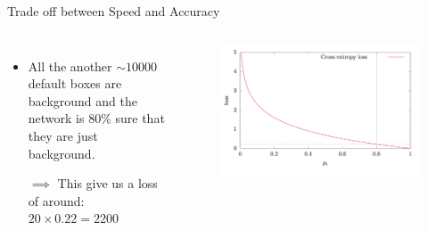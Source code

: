 \documentclass[aspectratio=169]{beamer}
\begin{document}
\begin{frame}{Trade off between Speed and Accuracy}
\begin{columns}[T, c, textwidth]
\begin{itemize}
    \item All the another $\sim10000$ default boxes are background and the network is 80\% sure that they are just background.
    
    $\implies$ This give us a loss of around: $20\times 0.22 = 2200$ 
\end{itemize}
\begin{figure}
    \centering
    \includegraphics[scale=.2]{demo/figs/fcl2.png}
\end{figure}
\end{columns}
\end{frame}
\end{document}
